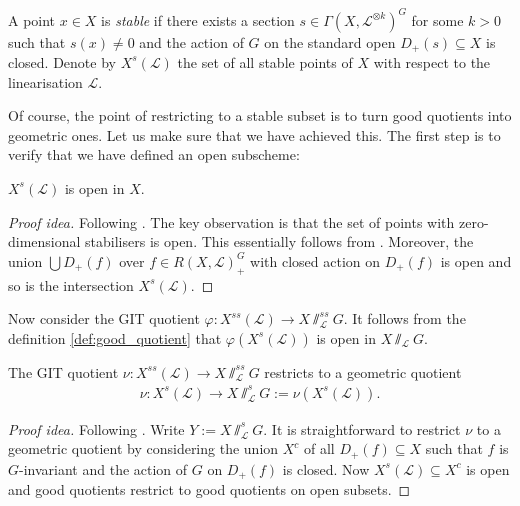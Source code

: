 \documentclass[12pt]{ociamthesis}  %
\begin{document}
\begin{definition}\label{def:git_stability}
  A point $x\in X$ is \emph{stable} if there exists a section
  $s\in\Gamma(X,\mathscr L^{\otimes k})^G$ for some $k>0$ such that $s(x)\neq 0$
  and the action of $G$ on the standard open $D_+(s)\subseteq X$ is closed.
  Denote by $X^s(\mathscr L)$ the set of all stable points of $X$ with respect
  to the linearisation $\mathscr L$.
\end{definition}

Of course, the point of restricting to a stable subset is to turn
good quotients into geometric ones. Let us make sure that we have
achieved this. The first step is to verify that we have defined
an open subscheme:

\begin{lemma}
  $X^s(\mathscr L)$ is open in $X$.
  \begin{proof}[Proof idea]
    Following \cite[Lemma 5.5]{hoskins2016}.  The key observation is that the
    set of points with zero-dimensional stabilisers is open. This essentially
    follows from \cite[III 12.8]{hartshorne1977}.  Moreover, the union $\bigcup
    D_+(f)$ over $f\in R(X,\mathscr L)_+^G$ with closed action on $D_+(f)$ is
    open and so is the intersection $X^s(\mathscr L)$.
  \end{proof}
\end{lemma}

Now consider the GIT quotient $\varphi : X^{ss}(\mathscr L)\to X\sslash^{ss}_{\mathscr L} G$.
It follows from the definition \ref{def:good_quotient} that
$\varphi(X^s(\mathscr L))$ is open in $X\sslash_{\mathscr L} G$.

\begin{theorem}
  The GIT quotient $\nu : X^{ss}({\mathscr L}) \to X\sslash^{ss}_{\mathscr L} G$
  restricts to a geometric quotient
  \begin{align*}
    \nu : X^s({\mathscr L}) \to X\sslash^s_{\mathscr L} G := \nu(X^s({\mathscr L})).
  \end{align*}
  \begin{proof}[Proof idea]
    Following \cite[Theorem 5.6]{hoskins2016}. Write
    $Y := X\sslash^s_{\mathscr L}G$. It is straightforward to
    restrict $\nu$ to a geometric quotient by considering the
    union $X^c$ of all $D_+(f)\subseteq X$ such that $f$ is $G$-invariant
    and the action of $G$ on $D_+(f)$ is closed. Now
    $X^s(\mathscr L)\subseteq X^c$ is open and good quotients restrict
    to good quotients on open subsets.
  \end{proof}
\end{theorem}
\end{document}

